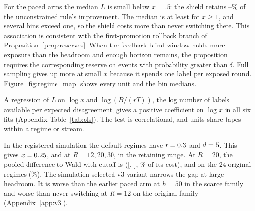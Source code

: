 \documentclass[10pt]{article}
\theoremstyle{plain}
\theoremstyle{definition}
\begin{document}
For the paced arms the median $L$ is small below $x=.5$: the shield retains \KeepLo--\KeepHi\% of the unconstrained rule's improvement. The median is at least \LargeXMin{} for $x\ge1$, and several bins exceed one, so the shield costs more than never switching there. This association is consistent with the first-promotion rollback branch of Proposition~\ref{prop:reserves}. When the feedback-blind window holds more exposure than the headroom and enough horizon remains, the proposition requires the corresponding reserve on events with probability greater than $\delta$. Full sampling gives up more at small $x$ because it spends one label per exposed round. Figure~\ref{fig:regime_map} shows every unit and the bin medians.


A regression of $L$ on $\log x$ and $\log(B/(rT))$, the log number of labels available per expected disagreement, gives a positive coefficient on $\log x$ in all six fits (Appendix Table~\ref{tab:ols}). The test is correlational, and units share tapes within a regime or stream.

In the registered simulation the default regimes have $r=0.3$ and $d=5$. This gives $x=0.25$, \DefXTwenty{} and \DefXThirty{} at $R=12,20,30$, in the retaining range. At $R=20$, the pooled difference to Wald with cutoff is \SimVsWaldDelta{} ([\SimVsWaldLo, \SimVsWaldHi], \SimVsWaldPct\% of its cost), and \OrigDelta{} on the 24 original regimes (\OrigPct\%). The simulation-selected v3 variant narrows the gap at large headroom. It is worse than the earlier paced arm at $h=50$ in the scarce family and worse than never switching at $R=12$ on the original family (Appendix~\ref{app:v3}).

\begin{table}[!htbp]
\caption{Regime map: Spearman correlation of $x=rd/h$ with $L$, the share of the unconstrained rule's improvement given up, and median $L$ by bin of $x$. ``Clusters'' counts regimes or streams; analysis units also vary by arm and headroom.}\label{tab:regime}
\centering\scriptsize
\resizebox{\linewidth}{!}{}
\end{table}

\FloatBarrier
\end{document}
